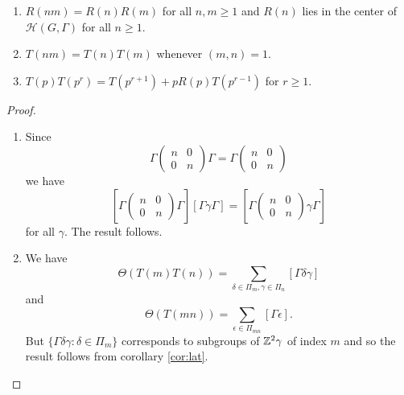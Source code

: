 \documentclass{memoir}
\begin{document}
\begin{thm}
    \begin{enumerate}
        \item $R(nm) = R(n)R(m)$ for all $n,m\ge 1$ and $R(n)$ lies in the center of $\mathcal H(G,\Gamma)$ for all $n\ge 1$.
        \item $T(nm) = T(n)T(m)$ whenever $(m,n) = 1$.
        \item $T(p)T(p^r) = T(p^{r+1}) + pR(p)T(p^{r-1})$ for $r\ge 1$.
    \end{enumerate}
\end{thm}
\begin{proof}
    \begin{enumerate}
        \item Since
            \begin{equation}
                \Gamma \begin{pmatrix} n & 0 \\ 0 & n\end{pmatrix} \Gamma =\Gamma \begin{pmatrix} n & 0 \\ 0 & n\end{pmatrix}
            \end{equation}
            we have
            \begin{equation}
                \left[\Gamma \begin{pmatrix} n & 0 \\ 0 & n\end{pmatrix} \Gamma\right] [\Gamma\gamma\Gamma] = \left[\Gamma \begin{pmatrix} n & 0 \\ 0 & n\end{pmatrix} \gamma \Gamma\right]
            \end{equation}
            for all $\gamma$.
            The result follows.
        \item We have
            \begin{equation}
                \Theta(T(m)T(n)) = \sum_{\delta\in\Pi_m,\gamma\in\Pi_n}[\Gamma \delta\gamma]
            \end{equation}
            and 
            \begin{equation}
                \Theta(T(mn)) = \sum_{\epsilon\in\Pi_{mn}}[\Gamma \epsilon].
            \end{equation}
            But $\{\Gamma\delta\gamma:\delta\in\Pi_m\}$ corresponds to subgroups of $\mathbb{Z}^2\gamma$ of index $m$ and so the result follows from corollary \ref{cor:lat}.

\end{enumerate}
\end{proof}
\end{document}
